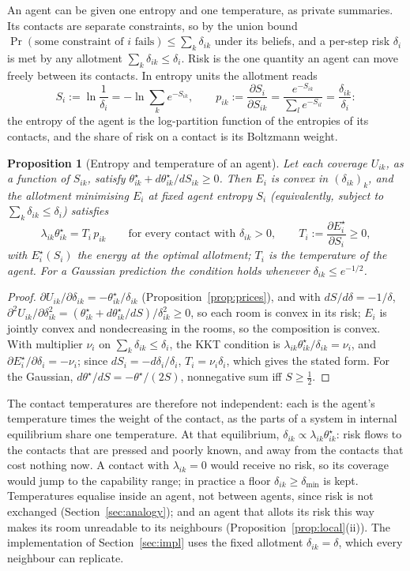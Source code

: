 \documentclass[11pt]{article}
\newtheorem{proposition}[theorem]{Proposition}
\theoremstyle{definition}
\theoremstyle{remark}
\renewcommand{\Pr}{\operatorname{Pr}}
\begin{document}
An agent can be given one entropy and one temperature, as private summaries. Its contacts are separate constraints, so by the union bound $\Pr(\text{some constraint of }i\text{ fails})\le\sum_k\delta_{ik}$ under its beliefs, and a per-step risk $\delta_i$ is met by any allotment $\sum_k\delta_{ik}\le\delta_i$. Risk is the one quantity an agent can move freely between its contacts. In entropy units the allotment reads
\[
S_i:=\ln\frac1{\delta_i}=-\ln\sum_ke^{-S_{ik}},\qquad p_{ik}:=\frac{\partial S_i}{\partial S_{ik}}=\frac{e^{-S_{ik}}}{\sum_le^{-S_{il}}}=\frac{\delta_{ik}}{\delta_i}:
\]
the entropy of the agent is the log-partition function of the entropies of its contacts, and the share of risk on a contact is its Boltzmann weight.

\begin{proposition}[Entropy and temperature of an agent]\label{prop:temp}
Let each coverage $U_{ik}$, as a function of $S_{ik}$, satisfy $\theta^\star_{ik}+d\theta^\star_{ik}/dS_{ik}\ge0$. Then $E_i$ is convex in $(\delta_{ik})_k$, and the allotment minimising $E_i$ at fixed agent entropy $S_i$ (equivalently, subject to $\sum_k\delta_{ik}\le\delta_i$) satisfies
\[
\lambda_{ik}\theta^\star_{ik}=T_i\,p_{ik}\qquad\text{for every contact with }\delta_{ik}>0,\qquad T_i:=\frac{\partial E_i^\star}{\partial S_i}\ge0,
\]
with $E_i^\star(S_i)$ the energy at the optimal allotment; $T_i$ is the temperature of the agent. For a Gaussian prediction the condition holds whenever $\delta_{ik}\le e^{-1/2}$.
\end{proposition}
\begin{proof}
$\partial U_{ik}/\partial\delta_{ik}=-\theta^\star_{ik}/\delta_{ik}$ (Proposition~\ref{prop:prices}), and with $dS/d\delta=-1/\delta$, $\partial^2U_{ik}/\partial\delta_{ik}^2=(\theta^\star_{ik}+d\theta^\star_{ik}/dS)/\delta_{ik}^2\ge0$, so each room is convex in its risk; $E_i$ is jointly convex and nondecreasing in the rooms, so the composition is convex. With multiplier $\nu_i$ on $\sum_k\delta_{ik}\le\delta_i$, the KKT condition is $\lambda_{ik}\theta^\star_{ik}/\delta_{ik}=\nu_i$, and $\partial E_i^\star/\partial\delta_i=-\nu_i$; since $dS_i=-d\delta_i/\delta_i$, $T_i=\nu_i\delta_i$, which gives the stated form. For the Gaussian, $d\theta^\star/dS=-\theta^\star/(2S)$, nonnegative sum iff $S\ge\frac12$.
\end{proof}

The contact temperatures are therefore not independent: each is the agent's temperature times the weight of the contact, as the parts of a system in internal equilibrium share one temperature. At that equilibrium, $\delta_{ik}\propto\lambda_{ik}\theta^\star_{ik}$: risk flows to the contacts that are pressed and poorly known, and away from the contacts that cost nothing now. A contact with $\lambda_{ik}=0$ would receive no risk, so its coverage would jump to the capability range; in practice a floor $\delta_{ik}\ge\delta_{\min}$ is kept. Temperatures equalise inside an agent, not between agents, since risk is not exchanged (Section~\ref{sec:analogy}); and an agent that allots its risk this way makes its room unreadable to its neighbours (Proposition~\ref{prop:local}(ii)). The implementation of Section~\ref{sec:impl} uses the fixed allotment $\delta_{ik}=\delta$, which every neighbour can replicate.
\end{document}

